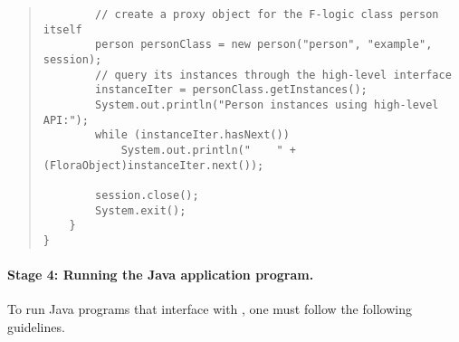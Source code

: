 \begin{quote}
\begin{verbatim}
        // create a proxy object for the F-logic class person itself
        person personClass = new person("person", "example", session);
        // query its instances through the high-level interface
        instanceIter = personClass.getInstances();
        System.out.println("Person instances using high-level API:");
        while (instanceIter.hasNext())
            System.out.println("    " + (FloraObject)instanceIter.next());
        
        session.close();
        System.exit();
    }
}
\end{verbatim}
\end{quote}

\paragraph{Stage 4: Running the Java application program.}
To run Java programs that interface with \FLORA, one must follow the
following guidelines.

